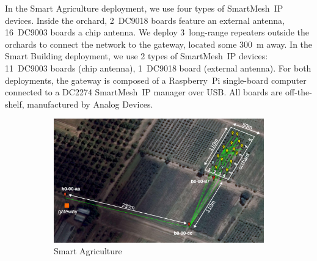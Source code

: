 \documentclass{elsarticle}
\newcommand{\smip}                {SmartMesh~IP\xspace}
\newcommand{\building}            {Smart Building\xspace}
\newcommand{\agri}                {Smart Agriculture\xspace}
\begin{document}

In the \agri deployment, we use four types of \smip devices.
Inside the orchard, 2~DC9018 boards feature an external antenna, 16~DC9003 boards a chip antenna.
We deploy 3~long-range repeaters outside the orchards to connect the network to the gateway, located some 300~m away.
In the \building deployment, we use 2 types of \smip devices: 11~DC9003 boards (chip antenna), 1~DC9018 board (external antenna).
For both deployments, the gateway is composed of a Raspberry~Pi single-board computer connected to a DC2274 \smip manager over USB.
All boards are off-the-shelf, manufactured by Analog Devices.

\begin{figure}
    \centering
    \begin{subfigure}[h]{0.70\textwidth}
        \includegraphics[width=\textwidth]{map_annotated}
        \caption{\agri}
        \label{fig:agri_map}
    \end{subfigure}
    \begin{subfigure}[h]{0.27\textwidth}  

\end{subfigure}
\end{figure}
\end{document}
